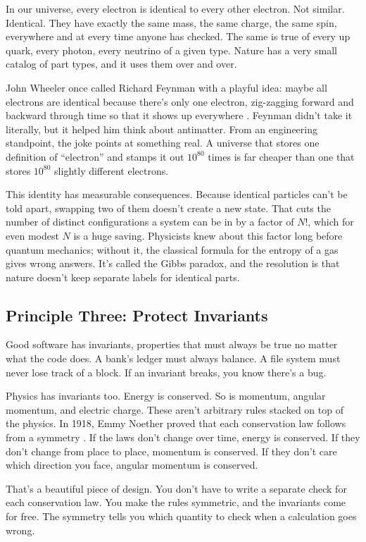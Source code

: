 In our universe, every electron is identical to every other electron. Not similar. Identical. They have exactly the same mass, the same charge, the same spin, everywhere and at every time anyone has checked. The same is true of every up quark, every photon, every neutrino of a given type. Nature has a very small catalog of part types, and it uses them over and over.

John Wheeler once called Richard Feynman with a playful idea: maybe all electrons are identical because there's only one electron, zig-zagging forward and backward through time so that it shows up everywhere \cite{feynman1965}. Feynman didn't take it literally, but it helped him think about antimatter. From an engineering standpoint, the joke points at something real. A universe that stores one definition of ``electron'' and stamps it out \(10^{80}\) times is far cheaper than one that stores \(10^{80}\) slightly different electrons.

This identity has measurable consequences. Because identical particles can't be told apart, swapping two of them doesn't create a new state. That cuts the number of distinct configurations a system can be in by a factor of \(N!\), which for even modest \(N\) is a huge saving. Physicists knew about this factor long before quantum mechanics; without it, the classical formula for the entropy of a gas gives wrong answers. It's called the Gibbs paradox, and the resolution is that nature doesn't keep separate labels for identical parts.

\subsection{Principle Three: Protect Invariants}

Good software has invariants, properties that must always be true no matter what the code does. A bank's ledger must always balance. A file system must never lose track of a block. If an invariant breaks, you know there's a bug.

Physics has invariants too. Energy is conserved. So is momentum, angular momentum, and electric charge. These aren't arbitrary rules stacked on top of the physics. In 1918, Emmy Noether proved that each conservation law follows from a symmetry \cite{noether1918}. If the laws don't change over time, energy is conserved. If they don't change from place to place, momentum is conserved. If they don't care which direction you face, angular momentum is conserved.

That's a beautiful piece of design. You don't have to write a separate check for each conservation law. You make the rules symmetric, and the invariants come for free. The symmetry tells you which quantity to check when a calculation goes wrong.

